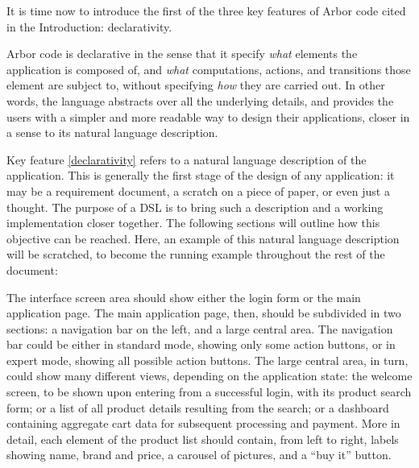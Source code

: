 \documentclass[12pt]{article} %
\newcommand{\DSL}{DSL}
\newcommand{\A}{Arbor}
\newcommand{\q}[1]{``#1''}
\newcounter{kfcounter}
\newenvironment{kfe}[2]
	{\refstepcounter{kfcounter}\begin{tcolorbox}[colback=green!35!white,colframe=brown!75!red,title=Key Feature \thekfcounter: \emph{#1}\label{#2}]}
	{\end{tcolorbox}}
\begin{document}
It is time now to introduce the first of the three key features of \A{} code cited in the Introduction: declarativity.
\begin{kfe}{Declarativity}{declarativity}
\A{} code is declarative in the sense that it specify \emph{what} elements the application is composed of, and \emph{what} computations, actions, and transitions those element are subject to, without specifying \emph{how} they are carried out. In other words, the language abstracts over all the underlying details, and provides the users with a simpler and more readable way to design their applications, closer in a sense to its natural language description.
\end{kfe}
Key feature \ref{declarativity} refers to a natural language description of the application. This is generally the first stage of the design of any application: it may be a requirement document, a scratch on a piece of paper, or even just a thought. The purpose of a \DSL{} is to bring such a description and a working implementation closer together. 
The following sections will outline how this objective can be reached. Here, an example of this natural language description will be scratched, to become the running example throughout the rest of the document:
\begin{tcolorbox}[colback=cyan!5!white,colframe=blue!75!black,title=Description of a webshop application in natural language]
The interface screen area should show either the login form or the main application page. 
The main application page, then, should be subdivided in two sections: a navigation bar on the left, and a large central area. The navigation bar could be either in standard mode, showing only some action buttons, or in expert mode, showing all possible action buttons. The large central area, in turn, could show many different views, depending on the application state: the welcome screen, to be shown upon entering from a successful login, with its product search form; or a list of all product details resulting from the search; or a dashboard containing aggregate cart data for subsequent processing and payment. More in detail, each element of the product list should contain, from left to right, labels showing name, brand and price, a carousel of pictures, and a \q{buy it} button.
\end{tcolorbox}
\end{document}
